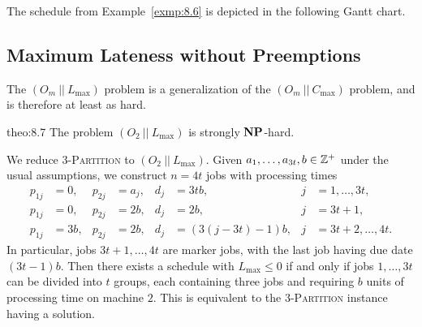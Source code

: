 The schedule from Example~\ref{exmp:8.6} is depicted in the following Gantt chart.
\begin{center}
\end{center}   
\vspace{-0.4cm}

\subsection{Maximum Lateness without Preemptions} \label{subsec:8.3} 
The $(O_m~||~L_{\max})$ problem is a generalization of the 
$(O_m~||~C_{\max})$ problem, and is therefore at least as hard. 

\begin{theo}{theo:8.7}
    The problem $(O_2~||~L_{\max})$ is strongly $\operatorname{\textbf{NP}}$-hard.
\end{theo}
\begin{pf}
    We reduce \textsc{$3$-Partition} to $(O_2~||~L_{\max})$. Given 
    $a_1, \dots, a_{3t}, b \in \mathbb{Z}^+$ under the usual assumptions, we 
    construct $n = 4t$ jobs with processing times 
    \begin{align*}
        p_{1j} &= 0, & p_{2j} &= a_j, & d_j &= 3tb, & j &= 1, \dots, 3t, \\ 
        p_{1j} &= 0, & p_{2j} &= 2b, & d_j &= 2b, & j &= 3t+1, \\ 
        p_{1j} &= 3b, & p_{2j} &= 2b, & d_j &= (3(j-3t)-1)b, & j &= 3t+2, \dots, 4t.
    \end{align*}
    In particular, jobs $3t+1, \dots, 4t$ are marker jobs, with the 
    last job having due date $(3t-1)b$. Then there exists a schedule 
    with $L_{\max} \leq 0$ if and only if jobs $1, \dots, 3t$ can be 
    divided into $t$ groups, each containing three jobs and requiring 
    $b$ units of processing time on machine $2$. This is equivalent to 
    the \textsc{$3$-Partition} instance having a solution. 
\end{pf}

